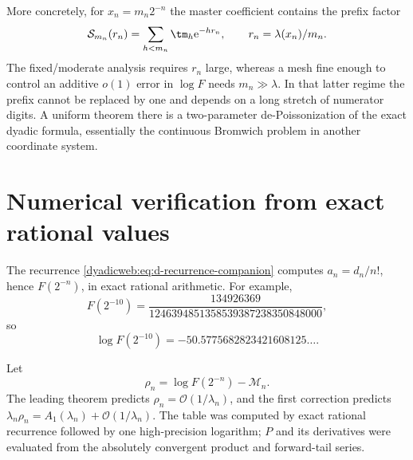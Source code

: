 \documentclass[11pt,oneside]{article}
\theoremstyle{definition}
\theoremstyle{remark}
\newcommand{\e}{\mathrm e}
\newcommand{\bigO}{\mathcal O}
\begin{document}
More concretely, for $x_n=m_n2^{-n}$ the master coefficient contains the prefix factor
\begin{equation}
 \mathcal S_{m_n}(r_n)=\sum_{h<m_n}\tm_h\e^{-hr_n},
 \qquad r_n=\lambda(x_n)/m_n.                              \label{dyadicasym:eq:large-prefix-problem}
\end{equation}
The fixed/moderate analysis requires $r_n$ large, whereas a mesh fine enough to control
an additive $o(1)$ error in $\log F$ needs $m_n\gg\lambda$.  In that latter regime the
prefix cannot be replaced by one and depends on a long stretch of numerator digits.  A
uniform theorem there is a two-parameter de-Poissonization of the exact dyadic formula,
essentially the continuous Bromwich problem in another coordinate system.

\section{Numerical verification from exact rational values}
\label{dyadicasym:sec:numerics}

The recurrence \eqref{dyadicweb:eq:d-recurrence-companion} computes $a_n=d_n/n!$, hence $F(2^{-n})$, in exact rational
arithmetic.  For example,
\begin{equation}
 F(2^{-10})=
 \frac{134926369}{1246394851358539387238350848000},         \label{dyadicasym:eq:F10}
\end{equation}
so
\begin{equation*}
 \log F(2^{-10})=-50.5775682823421608125\ldots.
\end{equation*}

Let
\begin{equation}
 \rho_n=\log F(2^{-n})-\mathcal M_n.                        \label{dyadicasym:eq:rho}
\end{equation}
The leading theorem predicts $\rho_n=\bigO(1/\lambda_n)$, and the first correction predicts
$\lambda_n\rho_n=A_1(\lambda_n)+\bigO(1/\lambda_n)$.  The table was computed by exact rational
recurrence followed by one high-precision logarithm; $P$ and its derivatives were evaluated
from the absolutely convergent product and forward-tail series.
\end{document}
